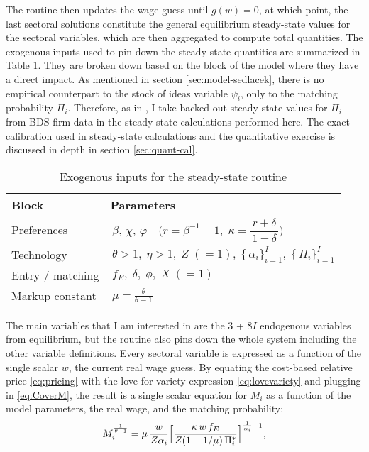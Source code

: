 \documentclass[a4paper,12pt]{article} %
\numberwithin{equation}{section} %
\numberwithin{figure}{section}
\numberwithin{table}{section}
\begin{document}
The routine then updates the wage guess until \(g(w)=0\), at which point, the last sectoral solutions constitute 
the general equilibrium steady-state values for the sectoral variables, which are then aggregated to compute total quantities.
The exogenous inputs used to pin down the steady-state quantities are summarized in Table \ref{tb:exoinputs}. They are broken
down based on the block of the model where they have a direct impact. As mentioned in section \ref{sec:model-sedlacek}, 
there is no empirical counterpart to the stock of ideas variable $\psi_i$, only to the matching probability $\Pi_i$.
Therefore, as in \textcite{sedlavcek2017growth}, I take backed-out steady-state values for $\Pi_i$ from BDS firm data 
in the steady-state calculations performed here. The exact calibration used in steady-state calculations and the 
quantitative exercise is discussed in depth in section \ref{sec:quant-cal}.

\begin{table}[H]
\centering
\begin{tabular}{@{}ll@{}}
\toprule
\textbf{Block} & \textbf{Parameters} \\ \midrule
Preferences & $\,\beta,\,\chi,\,\varphi\quad\bigl(r=\beta^{-1}-1,\;
                 \kappa=\dfrac{\,r+\delta\,}{1-\delta}\bigr)$ \\[4pt]
Technology  & $\,\theta>1,\;\eta>1,\;Z\;(=1),\;
               \{\,\alpha_i\}_{i=1}^{I},\; \{\,\Pi_i\}_{i=1}^{I}$ \\[4pt]
Entry / matching & $\,f_E,\;\delta,\;\phi,\;X\;(=1)$ \\[4pt]
Markup constant & $\,\displaystyle
                   \mu=\frac{\theta}{\theta-1}$ \\ \bottomrule
\end{tabular}
\caption{Exogenous inputs for the steady-state routine}
\label{tb:exoinputs}
\end{table}

 
The main variables that I am interested in are the 3 + 8$I$ endogenous variables from equilibrium, but the routine also
pins down the whole system including the other variable definitions. Every sectoral variable is expressed as a function of 
the single scalar $w$, the current real wage guess. By equating the cost-based relative price \eqref{eq:pricing} with the 
love-for-variety expression \eqref{eq:lovevariety} 
and plugging in \eqref{eq:CoverM}, the result is a single scalar equation for $M_i$ as a function of the model parameters,
the real wage, and the matching probability:
\begin{equation}
  M_i^{\frac1{\theta-1}}
=\mu\,\frac{w}{Z\alpha_i}
\Bigl[\frac{\kappa\,w\,f_E}{Z(1-1/\mu)\,\Pi_i^*}\Bigr]^{\frac1{\alpha_i}-1}, \label{Mscalar}
\end{equation}
\end{document}

